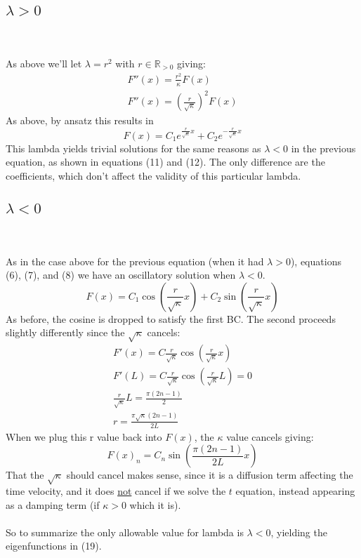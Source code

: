 \documentclass{article}
\begin{document}
\subsection*{$\lambda > 0$}~\\
\\
As above we'll let $\lambda = r^2$ with $r \in \mathbb{R}_{>0}$ giving:
\begin{equation}
\begin{aligned}
F''(x) = \frac{r^2}{\kappa} F(x)\\
F''(x) = (\frac{r}{\sqrt{\kappa}})^2 F(x)
\end{aligned}
\end{equation}
As above, by ansatz this results in 
\begin{equation}
F(x) = C_1e^{\frac{r}{\sqrt{\kappa}}x} + C_2e^{-\frac{r}{\sqrt{\kappa}}x}
\end{equation}
This lambda yields trivial solutions for the same reasons as $\lambda <0$ in the previous equation, as shown in equations (11) and (12). The only difference are the coefficients, which don't affect the validity of this particular lambda.
\subsection*{$\lambda < 0$}~\\
\\
As in the case above for the previous equation (when it had $\lambda >0$), equations (6), (7), and (8) we have an oscillatory solution when $\lambda<0$. 
\begin{equation}
F(x) = C_1\cos(\frac{r}{\sqrt{\kappa}}x) + C_2\sin(\frac{r}{\sqrt{\kappa}}x)
\end{equation}
As before, the cosine is dropped to satisfy the first BC. The second proceeds slightly differently since the $\sqrt{\kappa}$ cancels:
\begin{equation}
\begin{aligned}
F'(x) = C\frac{r}{\sqrt{\kappa}}\cos(\frac{r}{\sqrt{\kappa}}x)\\
F'(L) = C\frac{r}{\sqrt{\kappa}}\cos(\frac{r}{\sqrt{\kappa}}L) = 0\\
\frac{r}{\sqrt{\kappa}}L = \frac{\pi(2n-1)}{2}\\
r = \frac{\pi\sqrt{\kappa}(2n-1)}{2L}
\end{aligned}
\end{equation}
When we plug this r value back into $F(x)$, the $\kappa$ value cancels giving:
\begin{equation}
F(x)_n = C_n\sin(\frac{\pi(2n-1)}{2L}x)
\end{equation}
That the $\sqrt{\kappa}$ should cancel makes sense, since it is a diffusion term affecting the time velocity, and it does \underline{not} cancel if we solve the $t$ equation, instead appearing as a damping term (if $\kappa > 0$ which it is).\\
\\
So to summarize the only allowable value for lambda is $\lambda < 0$, yielding the eigenfunctions in (19).
\end{document}
